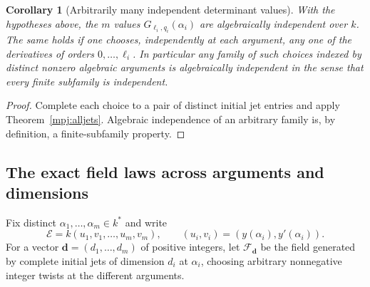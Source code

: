 \documentclass[11pt,a4paper]{article}
\newtheorem{corollary}[theorem]{Corollary}
\theoremstyle{definition}
\theoremstyle{remark}
\numberwithin{equation}{section}
\begin{document}
\begin{corollary}[Arbitrarily many independent determinant values]
\label{mpj:individual}
With the hypotheses above, the $m$ values
$G_{\ell_i,q_i}(\alpha_i)$ are algebraically independent over $k$.
The same holds if one chooses, independently at each argument,
any one of the derivatives of orders $0,\ldots,\ell_i$.
In particular any family of such choices indexed by distinct
nonzero algebraic arguments is algebraically independent in the
sense that every finite subfamily is independent.
\end{corollary}
\begin{proof}
Complete each choice to a pair of distinct initial jet entries
and apply Theorem~\ref{mpj:alljets}. Algebraic independence of
an arbitrary family is, by definition, a finite-subfamily property.
\end{proof}

\subsection{The exact field laws across arguments and dimensions}

Fix distinct $\alpha_1,\ldots,\alpha_m\in k^*$ and write
\[
 \mathcal E=k(u_1,v_1,\ldots,u_m,v_m),\qquad
 (u_i,v_i)=(y(\alpha_i),y'(\alpha_i)).
\]
For a vector $\mathbf d=(d_1,\ldots,d_m)$ of positive integers,
let $\mathcal F_{\mathbf d}$ be the field generated by complete
initial jets of dimension $d_i$ at $\alpha_i$, choosing arbitrary
nonnegative integer twists at the different arguments.
\end{document}
